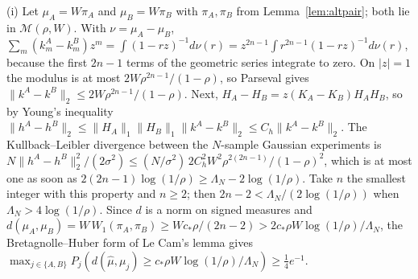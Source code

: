 (i) Let $\mu_A=W\pi_A$ and $\mu_B=W\pi_B$ with $\pi_A,\pi_B$ from Lemma~\ref{lem:altpair}; both lie in $\mathcal M(\rho,W)$. With $\nu=\mu_A-\mu_B$, $\sum_m(k^A_m-k^B_m)z^m=\int(1-rz)^{-1}d\nu(r)=z^{2n-1}\int r^{2n-1}(1-rz)^{-1}d\nu(r)$, because the first $2n-1$ terms of the geometric series integrate to zero. On $|z|=1$ the modulus is at most $2W\rho^{2n-1}/(1-\rho)$, so Parseval gives $\|k^A-k^B\|_2\le2W\rho^{2n-1}/(1-\rho)$. Next, $H_A-H_B=z(K_A-K_B)H_AH_B$, so by Young's inequality $\|h^A-h^B\|_2\le\|H_A\|_1\|H_B\|_1\|k^A-k^B\|_2\le C_h\|k^A-k^B\|_2$. The Kullback--Leibler divergence between the $N$-sample Gaussian experiments is $N\|h^A-h^B\|_2^2/(2\sigma^2)\le(N/\sigma^2)\,2C_h^2W^2\rho^{2(2n-1)}/(1-\rho)^2$, which is at most one as soon as $2(2n-1)\log(1/\rho)\ge\Lambda_N-2\log(1/\rho)$. Take $n$ the smallest integer with this property and $n\ge2$; then $2n-2<\Lambda_N/(2\log(1/\rho))$ when $\Lambda_N>4\log(1/\rho)$. Since $d$ is a norm on signed measures and $d(\mu_A,\mu_B)=W\,W_1(\pi_A,\pi_B)\ge Wc_*\rho/(2n-2)>2c_*\rho W\log(1/\rho)/\Lambda_N$, the Bretagnolle--Huber form of Le Cam's lemma \citep[Lemma 2.6 and Theorem 2.2]{tsybakov2009} gives $\max_{j\in\{A,B\}}P_j(d(\hat\mu,\mu_j)\ge c_*\rho W\log(1/\rho)/\Lambda_N)\ge\tfrac14e^{-1}$.

